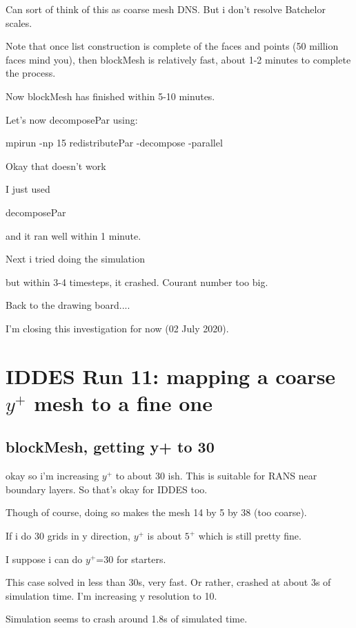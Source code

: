 \documentclass[12pt]{article}
\renewcommand{\_}{\kern-1.5pt\textunderscore\kern-1.5pt}
\begin{document}
Can sort of think of this as coarse mesh DNS. But i don't resolve Batchelor scales.



Note that once list construction is complete of the faces and points (50 million faces mind you), then blockMesh is relatively fast, about 1-2 minutes to complete the process.


Now blockMesh has finished within 5-10 minutes.


Let's now decomposePar using:


mpirun -np 15 redistributePar -decompose -parallel 


Okay that doesn't work



I just used 


decomposePar


and it ran well within 1 minute.



Next i tried doing the simulation


but within 3-4 timesteps, it crashed. Courant number too big.



Back to the drawing board....


I'm closing this investigation for now (02 July 2020).

\section{IDDES Run 11: mapping a coarse $y^+$ mesh to a fine one}

\subsection{blockMesh, getting y+ to 30}

okay so i'm increasing $y^+$ to about 30 ish. This is suitable for RANS near boundary layers. So that's okay for IDDES too. 

Though of course, doing so makes the mesh 14 by 5 by 38 (too coarse).

If i do 30 grids in y direction, $y^+$ is about $5^+$ which is still pretty fine.

I suppose i can do $y^+$=30 for starters.

This case solved in less than 30s, very fast. Or rather, crashed at about 3s of simulation time.
I'm increasing y resolution to 10. 

Simulation seems to crash around 1.8s of simulated time. 
\end{document}
